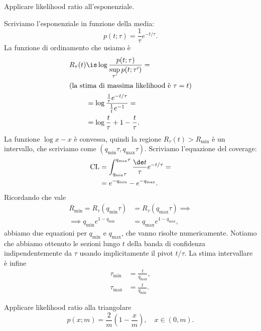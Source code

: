 
\begin{exercise}
	\label{th:lrexp}
	Applicare likelihood ratio all'esponenziale.
\end{exercise}

\begin{solution*}
	Scriviamo l'esponenziale in funzione della media:
	\begin{equation*}
		p(t;\tau)
		= \frac1\tau e^{-t/\tau}.
	\end{equation*}
	La funzione di ordinamento che usiamo è
	\begin{align*}
		R_\tau(t)
		&\is \log \frac {p(t;\tau)} {\sup\limits_{\tau'} p(t;\tau')} = \\
		\intertext{(la stima di massima likelihood è $\tau=t$)}
		&= \log \frac {\frac1\tau e^{-t/\tau}} {\frac1t e^{-1}} = \\
		&= \log\frac t\tau + 1 - \frac t\tau.
	\end{align*}
	La funzione $\log x - x$ è convessa,
	quindi la regione $R_\tau(t)>R_\mathrm{min}$ è un intervallo,
	che scriviamo come $(q_\mathrm{min}\tau, q_\mathrm{max}\tau)$.
	Scriviamo l'equazione del coverage:
	\begin{align*}
		\mathrm{CL}
		&= \int_{q_\mathrm{min}\tau}^{q_\mathrm{max}\tau} \frac{\de t}\tau e^{-t/\tau} = \\
		&= e^{-q_\mathrm{min}} - e^{-q_\mathrm{max}}.
	\end{align*}
	Ricordando che vale
	\begin{align*}
		R_\mathrm{min} = R_\tau(q_\mathrm{min}\tau)
		&= R_\tau(q_\mathrm{max}\tau) \implies \\
		\implies q_\mathrm{min} e^{1-q_\mathrm{min}}
		&= q_\mathrm{max} e^{1-q_\mathrm{max}},
	\end{align*}
	abbiamo due equazioni per $q_\mathrm{min}$ e $q_\mathrm{max}$,
	che vanno risolte numericamente.
	Notiamo che abbiamo ottenuto le sezioni lungo $t$ della banda di confidenza
	indipendentemente da $\tau$
	usando implicitamente il pivot $t/\tau$.
	La stima intervallare è infine
	\begin{align*}
		\tau_\mathrm{min}
		&= \frac t {q_\mathrm{max}}, \\
		\tau_\mathrm{max}
		&= \frac t {q_\mathrm{min}}.
	\end{align*}
\end{solution*}

\begin{exercise}
	\label{th:lrtri}
	Applicare likelihood ratio alla triangolare
	\begin{equation*}
		p(x;m)
		= \frac2m\left(1-\frac xm\right),
		\quad x \in (0,m).
	\end{equation*}
\end{exercise}

